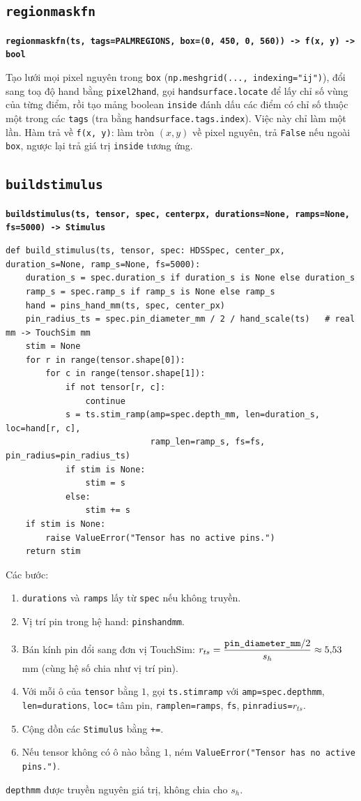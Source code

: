 \documentclass[11pt,a4paper]{article}
\renewcommand{\_}{\textunderscore\hspace{0pt}}
\newcommand{\code}[1]{\texttt{#1}}
\newcommand{\hs}{\ensuremath{s_h}}
\newcommand{\sig}[1]{\par\smallskip\noindent\textbf{\texttt{#1}}\par\nopagebreak}
\begin{document}
\subsection{\texttt{region\_mask\_fn}}
\sig{region\_mask\_fn(ts, tags=PALM\_REGIONS, box=(0, 450, 0, 560)) -> f(x, y) -> bool}
Tạo lưới mọi pixel nguyên trong \code{box} (\code{np.meshgrid(..., indexing="ij")}), đổi sang toạ độ hand bằng \code{pixel2hand}, gọi \code{hand\_surface.locate} để lấy chỉ số vùng của từng điểm, rồi tạo mảng boolean \code{inside} đánh dấu các điểm có chỉ số thuộc một trong các \code{tags} (tra bằng \code{hand\_surface.tags.index}). Việc này chỉ làm một lần. Hàm trả về \code{f(x, y)}: làm tròn $(x,y)$ về pixel nguyên, trả \code{False} nếu ngoài \code{box}, ngược lại trả giá trị \code{inside} tương ứng.

\subsection{\texttt{build\_stimulus}}
\sig{build\_stimulus(ts, tensor, spec, center\_px, duration\_s=None, ramp\_s=None, fs=5000) -> Stimulus}
\begin{lstlisting}
def build_stimulus(ts, tensor, spec: HDSSpec, center_px, duration_s=None, ramp_s=None, fs=5000):
    duration_s = spec.duration_s if duration_s is None else duration_s
    ramp_s = spec.ramp_s if ramp_s is None else ramp_s
    hand = pins_hand_mm(ts, spec, center_px)
    pin_radius_ts = spec.pin_diameter_mm / 2 / hand_scale(ts)   # real mm -> TouchSim mm
    stim = None
    for r in range(tensor.shape[0]):
        for c in range(tensor.shape[1]):
            if not tensor[r, c]:
                continue
            s = ts.stim_ramp(amp=spec.depth_mm, len=duration_s, loc=hand[r, c],
                             ramp_len=ramp_s, fs=fs, pin_radius=pin_radius_ts)
            if stim is None:
                stim = s
            else:
                stim += s
    if stim is None:
        raise ValueError("Tensor has no active pins.")
    return stim
\end{lstlisting}
Các bước:
\begin{enumerate}
\item \code{duration\_s} và \code{ramp\_s} lấy từ \code{spec} nếu không truyền.
\item Vị trí pin trong hệ hand: \code{pins\_hand\_mm}.
\item Bán kính pin đổi sang đơn vị TouchSim: $r_{ts}=\dfrac{\code{pin\_diameter\_mm}/2}{\hs}\approx5{,}53$ mm (cùng hệ số chia như vị trí pin).
\item Với mỗi ô của \code{tensor} bằng $1$, gọi \code{ts.stim\_ramp} với \code{amp=spec.depth\_mm}, \code{len=duration\_s}, \code{loc=} tâm pin, \code{ramp\_len=ramp\_s}, \code{fs}, \code{pin\_radius=}$r_{ts}$.
\item Cộng dồn các \code{Stimulus} bằng \code{+=}.
\item Nếu tensor không có ô nào bằng $1$, ném \code{ValueError("Tensor has no active pins.")}.
\end{enumerate}
\code{depth\_mm} được truyền nguyên giá trị, không chia cho $\hs$.
\end{document}
